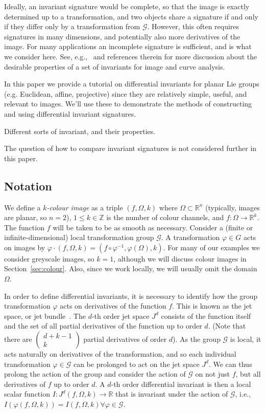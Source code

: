 \documentclass[review,onefignum,onetabnum]{siamonline190516}
\def\R{\mathbb{R}}
\begin{document}
Ideally, an invariant signature would be complete, so that the image is exactly determined up to a transformation, and two objects share a signature if and only if they differ only by a transformation from $\mathcal{G}$. However, this often requires signatures in many dimensions, and potentially also more derivatives of the image. For many applications an incomplete signature is sufficient, and is what we consider here. See, e.g.,~\cite{UsMobius} and references therein for more discussion about the desirable properties of a set of invariants for image and curve analysis.


In this paper we provide a tutorial on differential invariants for planar Lie groups (e.g.
Euclidean, affine, projective) since they are relatively simple, useful,
and relevant to images. We'll use these to demonstrate the methods of
constructing and using differential invariant signatures. 


Different sorts of invariant, and their properties.

The question of how to compare invariant signatures is not considered further in this paper.



\subsection{Notation}

We define a {\em $k$-colour image} as a triple $(f,\Omega,k)$ where $\Omega\subset\R^n$ (typically, images are planar, so $n=2$), $1\le k\in\mathbb{Z}$ is the number of colour channels, and $f\colon\Omega\to\R^k$. The function $f$ will be taken to be as smooth as necessary. Consider a (finite or infinite-dimensional) local transformation group $\mathcal{G}$.  A transformation $\varphi\in G$ acts on images by $\varphi\cdot (f,\Omega,k) = (f\circ\varphi^{-1},\varphi(\Omega),k)$. For many of our examples we consider greyscale images, so $k=1$, although we will discuss colour images in Section~\ref{sec:colour}. Also, since we work locally, we will usually omit the domain $\Omega$.

In order to define differential invariants, it is necessary to identify how the group transformation $\varphi$ acts on derivatives of the function $f$. This is known as the jet space, or jet bundle~\cite{OlverJets}. The $d$-th order jet space $J^d$ consists of the function itself and the set of all partial derivatives of the function up to order $d$. (Note that there are $\left( \begin{array}{c} d+k-1 \\ k \end{array} \right)$ partial derivatives of order $d$). As the group $\mathcal{G}$ is local, it acts naturally on derivatives of the transformation, and so each individual transformation $\varphi \in \mathcal{G}$ can be prolonged to act on the jet space $J^d$. We can thus prolong the action of the group and consider the action of $\mathcal{G}$ on not just $f$, but all derivatives of $f$ up to order $d$. A $d$-th order differential invariant is then a local scalar function $I: J^{d} (f,\Omega, k) \to \mathbb{R}$ that is invariant under the action of $\mathcal{G}$, i.e., $I(\varphi(f,\Omega, k)) = I(f, \Omega, k) \forall \varphi \in \mathcal{G}$. 
\end{document}

